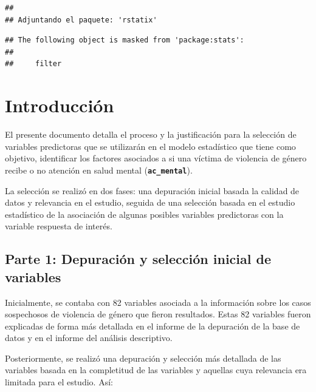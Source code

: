 \documentclass[
]{article}
\begin{document}
\begin{verbatim}
## 
## Adjuntando el paquete: 'rstatix'
\end{verbatim}

\begin{verbatim}
## The following object is masked from 'package:stats':
## 
##     filter
\end{verbatim}

\newpage

\section{Introducción}\label{introducciuxf3n}

El presente documento detalla el proceso y la justificación para la
selección de variables predictoras que se utilizarán en el modelo
estadístico que tiene como objetivo, identificar los factores asociados
a si una víctima de violencia de género recibe o no atención en salud
mental (\textbf{\texttt{ac\_mental}}).

La selección se realizó en dos fases: una depuración inicial basada la
calidad de datos y relevancia en el estudio, seguida de una selección
basada en el estudio estadístico de la asociación de algunas posibles
variables predictoras con la variable respuesta de interés.

\subsection{Parte 1: Depuración y selección inicial de
variables}\label{parte-1-depuraciuxf3n-y-selecciuxf3n-inicial-de-variables}

Inicialmente, se contaba con 82 variables asociada a la información
sobre los casos sospechosos de violencia de género que fieron
resultados. Estas 82 variables fueron explicadas de forma más detallada
en el informe de la depuración de la base de datos y en el informe del
análisis descriptivo.

Posteriormente, se realizó una depuración y selección más detallada de
las variables basada en la completitud de las variables y aquellas cuya
relevancia era limitada para el estudio. Así:
\end{document}
